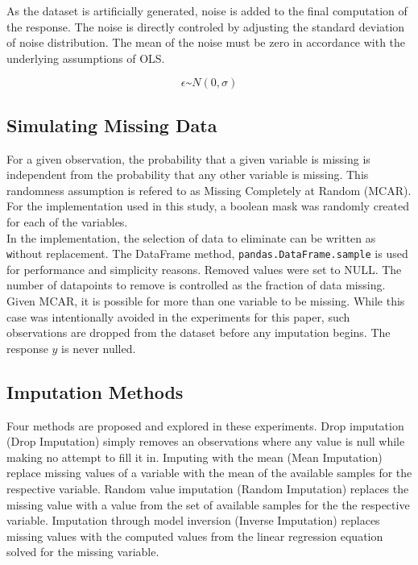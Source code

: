 \documentclass[../../paper.tex]{subfiles}
\begin{document}
As the dataset is artificially generated, noise is added to the final
computation of the response.
The noise is directly controled by adjusting the standard deviation of noise distribution.
The mean of the noise must be zero in accordance with the underlying assumptions of OLS.

%
\begin{equation}\label{eq:epsilon_def}
  \epsilon \text{\textasciitilde} N(0, \sigma)
\end{equation}
%
%


\subsection{Simulating Missing Data}
For a given observation, the probability that a given variable is missing is
independent from the probability that any other variable is missing. This randomness
assumption is refered to as Missing Completely at Random (MCAR). For the implementation
used in this study, a boolean mask was randomly created for each
of the variables. \\
In the implementation, the selection of data to eliminate can be written as
\texttt without replacement.
The DataFrame method, \texttt{pandas.DataFrame.sample} is used for
performance and simplicity reasons. Removed values were set to NULL. The number of
datapoints to remove is controlled as the fraction of data missing. Given MCAR,
it is possible for more than one variable to be missing. While this case was intentionally avoided in the experiments for this paper, such observations are dropped from the dataset before any imputation begins.
The response $y$ is never nulled.


\subsection{Imputation Methods}

Four methods are proposed and explored in these experiments.
Drop imputation (Drop Imputation) simply removes an observations where any value is null while making no attempt to fill it in.
Imputing with the mean (Mean Imputation) replace missing values of a variable with the mean of the available samples for the respective variable.
Random value imputation (Random Imputation) replaces the missing value with a value from the set of available samples for the the respective variable.
Imputation through model inversion (Inverse Imputation) replaces missing values with the computed values from the linear regression equation solved for the missing variable.
\end{document}
